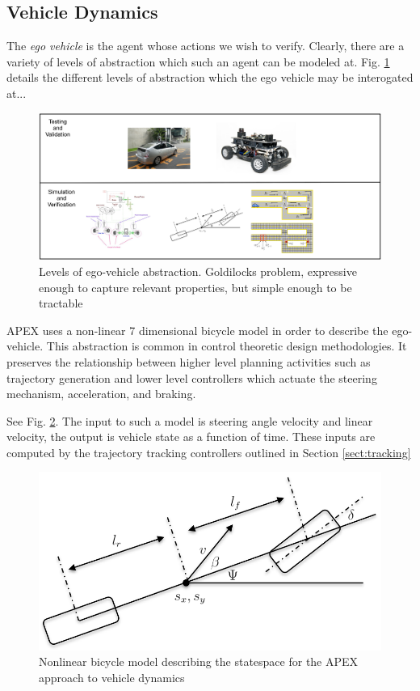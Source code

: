 \subsection{Vehicle Dynamics}
\label{sect:vehicle-dynamics}
The \emph{ego vehicle} is the agent whose actions we wish to verify. Clearly, there are a variety of levels of abstraction which such an agent can be modeled at. Fig. \ref{fig:abstraction} details the different levels of abstraction which the ego vehicle may be interogated at...

\begin{figure}
	\includegraphics[width=\textwidth]{figures/abstraction}
	\caption{Levels of ego-vehicle abstraction. Goldilocks problem, expressive enough to capture relevant properties, but simple enough to be tractable}
	\label{fig:abstraction}
\end{figure}
APEX uses a non-linear 7 dimensional bicycle model \cite{Rajamani2011} in order to describe the ego-vehicle. This abstraction is common in control theoretic design methodologies. It preserves the relationship between higher level planning activities such as trajectory generation and lower level controllers which actuate the steering mechanism, acceleration, and braking. 

See Fig. \ref{fig:bike}. 
The input to such a model is steering angle velocity and linear velocity, the output is vehicle state as a function of time. These inputs are computed by the trajectory tracking controllers outlined in Section \ref{sect:tracking}

\begin{figure}
	\centering
	\includegraphics[scale=.75]{figures/bicycle_model}
	\caption{Nonlinear bicycle model describing the statespace for the APEX approach to vehicle dynamics}
	\label{fig:bike}
\end{figure}

